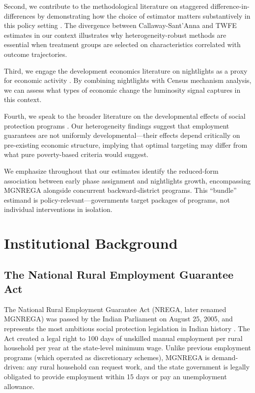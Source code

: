 \documentclass[12pt]{article}
\begin{document}
Second, we contribute to the methodological literature on staggered difference-in-differences by demonstrating how the choice of estimator matters substantively in this policy setting \citep{callaway2021difference, sun2021estimating, borusyak2024revisiting}. The divergence between Callaway-Sant'Anna and TWFE estimates in our context illustrates why heterogeneity-robust methods are essential when treatment groups are selected on characteristics correlated with outcome trajectories.

Third, we engage the development economics literature on nightlights as a proxy for economic activity \citep{henderson2012measuring, asher2021development, donaldson2016view}. By combining nightlights with Census mechanism analysis, we can assess what types of economic change the luminosity signal captures in this context.

Fourth, we speak to the broader literature on the developmental effects of social protection programs \citep{banerjee2017long, baird2014designing, duflo2012incentives}. Our heterogeneity findings suggest that employment guarantees are not uniformly developmental---their effects depend critically on pre-existing economic structure, implying that optimal targeting may differ from what pure poverty-based criteria would suggest.

We emphasize throughout that our estimates identify the reduced-form association between early phase assignment and nightlights growth, encompassing MGNREGA alongside concurrent backward-district programs. This ``bundle'' estimand is policy-relevant---governments target packages of programs, not individual interventions in isolation.



\section{Institutional Background}

\subsection{The National Rural Employment Guarantee Act}

The National Rural Employment Guarantee Act (NREGA, later renamed MGNREGA) was passed by the Indian Parliament on August 25, 2005, and represents the most ambitious social protection legislation in Indian history \citep{dreze2011employment}. The Act created a legal right to 100 days of unskilled manual employment per rural household per year at the state-level minimum wage. Unlike previous employment programs (which operated as discretionary schemes), MGNREGA is demand-driven: any rural household can request work, and the state government is legally obligated to provide employment within 15 days or pay an unemployment allowance.
\end{document}
